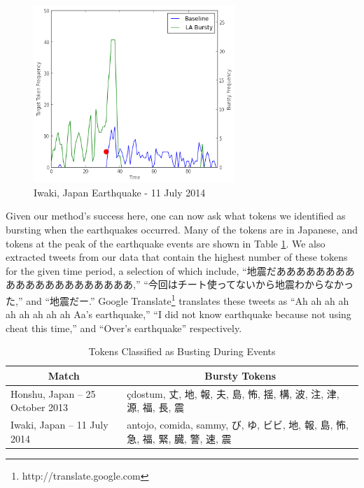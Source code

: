 \documentclass{acm_proc_article-sp}
\begin{document}
\begin{figure}[hbtp]
\begin{center}
\includegraphics[width=3in]{./figures/2014-japan-quake.png}
\caption{Iwaki, Japan Earthquake - 11 July 2014}
\label{fig:2014Japan}
\end{center}
\end{figure}

Given our method's success here, one can now ask what tokens we identified as bursting when the earthquakes occurred.
Many of the tokens are in Japanese, and tokens at the peak of the earthquake events are shown in Table \ref{tab:japanTokens}.
We also extracted tweets from our data that contain the highest number of these tokens for the given time period, a selection of which include, ``地震だあああああああああああああああああああああ,'' ``今回はチート使ってないから地震わからなかった,'' and ``地震だー.''
Google Translate\footnote{http://translate.google.com} translates these tweets as ``Ah ah ah ah ah ah ah ah ah Aa's earthquake,'' ``I did not know earthquake because not using cheat this time,'' and ``Over's earthquake'' respectively.

\begin{table}[htdp]
\caption{Tokens Classified as Busting During Events}
\begin{center}
\begin{tabular}{|p{1.45in} | p{1.45in} |}
\hline
\multicolumn{1}{|c|}{\textbf{Match}} & \multicolumn{1}{|c|}{\textbf{Bursty Tokens}} \\ \hline
Honshu, Japan -- 25 October 2013 & \c{c}dostum, 丈, 地, 報, 夫, 島, 怖, 揺, 構, 波, 注, 津, 源, 福, 長, 震 \\ \hline
Iwaki, Japan -- 11 July 2014 & antojo, comida, sammy, び, ゆ, ビビ, 地, 報, 島, 怖, 急, 福, 緊, 臓, 警, 速, 震 \\ \hline
\end{tabular}
\end{center}
\label{tab:japanTokens}
\end{table}
\end{document}
